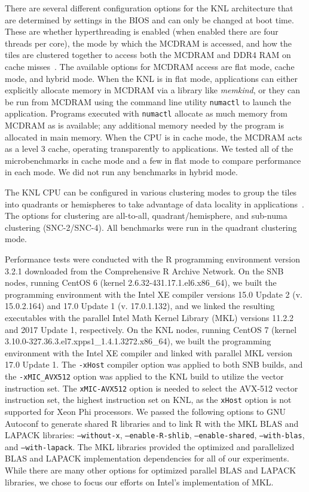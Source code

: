 There are several different configuration options for the KNL architecture that are
determined by settings in the BIOS and can only be changed at boot time. These are whether
hyperthreading is enabled (when enabled there are four threads per core), the mode by
which the MCDRAM is accessed, and how the tiles are clustered together to access both the
MCDRAM and DDR4 RAM on cache misses~\cite{vladimirov:knlModes, asai:mcdramKnl}.  The
available options for MCDRAM access are flat mode, cache mode, and hybrid mode.  When the
KNL is in flat mode, applications can either explicitly allocate memory in MCDRAM via a
library like \textit{memkind}, or they can be run from MCDRAM using the command line
utility \texttt{numactl} to launch the application. Programs executed with
\texttt{numactl} allocate as much memory from MCDRAM as is available; any additional
memory needed by the program is allocated in main memory. When the CPU is in cache mode,
the MCDRAM acts as a level 3 cache, operating transparently to applications. We tested all
of the microbenchmarks in cache mode and a few in flat mode to compare performance in each
mode. We did not run any benchmarks in hybrid mode.

The KNL CPU can be configured in various clustering modes to group the tiles into
quadrants or hemispheres to take advantage of data locality in
applications~\cite{vladimirov:knlModes}. The options for clustering are all-to-all,
quadrant/hemisphere, and sub-numa clustering (SNC-2/SNC-4). All benchmarks were run in the
quadrant clustering mode.

Performance tests were conducted with the R programming environment version 3.2.1
downloaded from the Comprehensive R Archive Network. On the SNB nodes, running CentOS 6
(kernel 2.6.32-431.17.1.el6.x86\_64), we built the programming environment with the Intel
XE compiler versions 15.0 Update 2 (v. 15.0.2.164) and 17.0 Update 1 (v. 17.0.1.132), and
we linked the resulting executables with the parallel Intel Math Kernel Library (MKL)
versions 11.2.2 and 2017 Update 1, respectively. On the KNL nodes, running CentOS 7
(kernel 3.10.0-327.36.3.el7.xpps1\_1.4.1.3272.x86\_64), we built the programming
environment with the Intel XE compiler and linked with parallel MKL version 17.0 Update 1.
The \texttt{-xHost} compiler option was applied to both SNB builds, and the
\texttt{-xMIC\_AVX512} option was applied to the KNL build to utilize the
vector instruction set. The \texttt{xMIC-AVX512} option is needed to select the AVX-512
vector instruction set, the highest instruction set on KNL, as the
\texttt{xHost} option is not supported for Xeon Phi processors. We passed the following
options to GNU Autoconf to generate shared R libraries and to link R with the MKL BLAS and
LAPACK libraries: \texttt{--without-x}, \texttt{--enable-R-shlib},
\texttt{--enable-shared}, \texttt{--with-blas}, and \texttt{--with-lapack}. The MKL
libraries provided the optimized and parallelized BLAS and LAPACK implementation
dependencies for all of our experiments. While there are many other options for optimized parallel BLAS and LAPACK libraries, we chose to focus our efforts on Intel's implementation of MKL.

